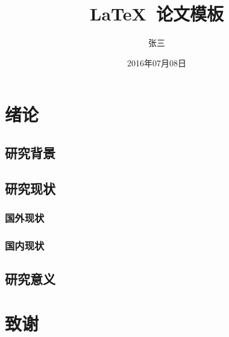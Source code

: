 \documentclass{swustthesis}
\title{\LaTeX\ 论文模板}
\author{张三}
\date{2016年07月08日}
\begin{document}
\maketitle

\frontmatter
\tableofcontents

\mainmatter
\chapter{绪论}
\section{研究背景}
\section{研究现状}
\subsection{国外现状}
\subsection{国内现状}
\section{研究意义}

\backmatter
\chapter{致谢}
\end{document}

